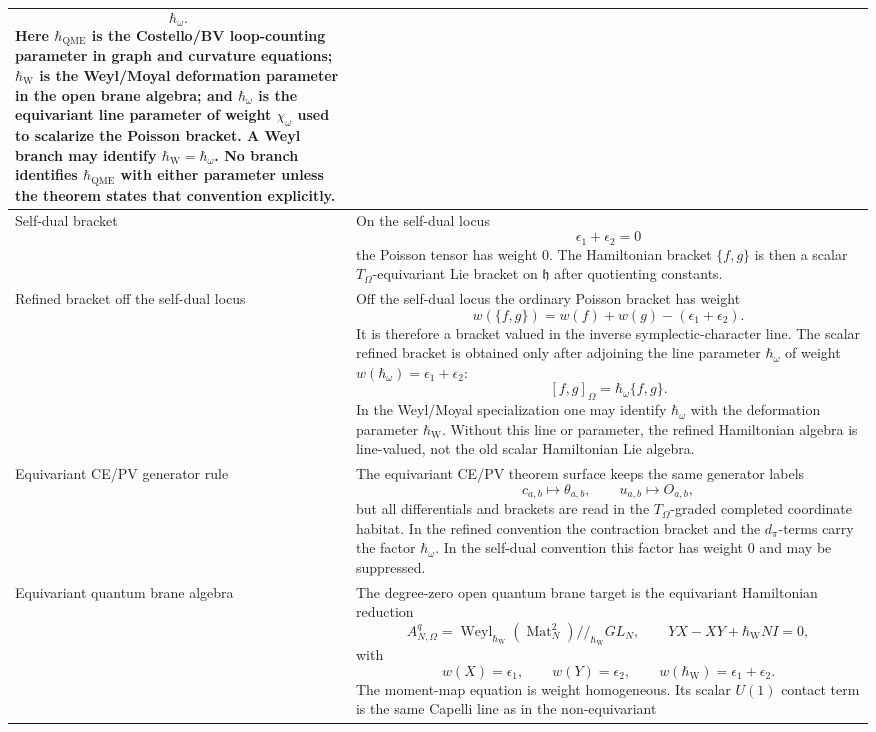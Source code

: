 \begin{longtable}{@{}>{\raggedright\arraybackslash}p{}
  >{\raggedright\arraybackslash}p{}@{}}
\[  \hbar_\omega .
\]
Here \(\hbar_{\mathrm{QME}}\) is the Costello/BV loop-counting parameter
in graph and curvature equations; \(\hbar_{\mathrm{W}}\) is the
Weyl/Moyal deformation parameter in the open brane algebra; and
\(\hbar_\omega\) is the equivariant line parameter of weight
\(\chi_\omega\) used to scalarize the Poisson bracket.  A Weyl branch may
identify \(\hbar_{\mathrm{W}}=\hbar_\omega\).  No branch identifies
\(\hbar_{\mathrm{QME}}\) with either parameter unless the theorem states
that convention explicitly.\\
\hline
Self-dual bracket &
On the self-dual locus
\[
  \epsilon_1+\epsilon_2=0
\]
the Poisson tensor has weight \(0\).  The Hamiltonian bracket
\(\{f,g\}\) is then a scalar \(T_\Omega\)-equivariant Lie bracket on
\(\mathfrak h\) after quotienting constants.\\
\hline
Refined bracket off the self-dual locus &
Off the self-dual locus the ordinary Poisson bracket has weight
\[
  w(\{f,g\})=w(f)+w(g)-(\epsilon_1+\epsilon_2).
\]
It is therefore a bracket valued in the inverse symplectic-character
line.  The scalar refined bracket is obtained only after adjoining the
line parameter \(\hbar_\omega\) of weight
\(w(\hbar_\omega)=\epsilon_1+\epsilon_2\):
\[
  [f,g]_\Omega=\hbar_\omega\{f,g\}.
\]
In the Weyl/Moyal specialization one may identify
\(\hbar_\omega\) with the deformation parameter
\(\hbar_{\mathrm{W}}\).  Without this line or parameter, the refined
Hamiltonian algebra is line-valued, not the old scalar Hamiltonian Lie
algebra.\\
\hline
Equivariant CE/PV generator rule &
The equivariant CE/PV theorem surface keeps the same generator labels
\[
  c_{a,b}\mapsto\theta_{a,b},\qquad
  u_{a,b}\mapsto O_{a,b},
\]
but all differentials and brackets are read in the \(T_\Omega\)-graded
completed coordinate habitat.  In the refined convention the contraction
bracket and the \(d_\pi\)-terms carry the factor \(\hbar_\omega\).  In the
self-dual convention this factor has weight \(0\) and may be suppressed.\\
\hline
Equivariant quantum brane algebra &
The degree-zero open quantum brane target is the equivariant Hamiltonian
reduction
\[
  A^q_{N,\Omega}
  =
  \operatorname{Weyl}_{\hbar_{\mathrm{W}}}(\operatorname{Mat}_N^2)
  //_{\hbar_{\mathrm{W}}} GL_N,
  \qquad
  YX-XY+\hbar_{\mathrm{W}}NI=0,
\]
with
\[
  w(X)=\epsilon_1,\qquad
  w(Y)=\epsilon_2,\qquad
  w(\hbar_{\mathrm{W}})=\epsilon_1+\epsilon_2.
\]
The moment-map equation is weight homogeneous.  Its scalar \(U(1)\)
contact term is the same Capelli line as in the non-equivariant

\end{longtable}
